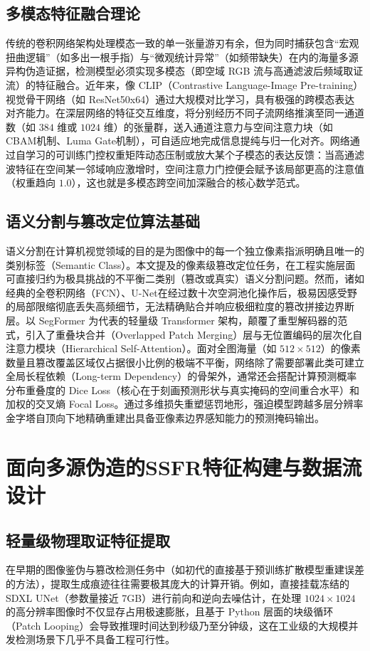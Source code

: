 \documentclass[UTF8, a4paper, 12pt]{ctexrep}
\begin{document}
\section{多模态特征融合理论}
传统的卷积网络架构处理模态一致的单一张量游刃有余，但为同时捕获包含“宏观扭曲逻辑”（如多出一根手指）与“微观统计异常”（如频带缺失）在内的海量多源异构伪造证据，检测模型必须实现多模态（即空域 RGB 流与高通滤波后频域取证流）的特征融合。近年来，像 CLIP（Contrastive Language-Image Pre-training）视觉骨干网络（如 ResNet50x64）通过大规模对比学习，具有极强的跨模态表达对齐能力。在深层网络的特征交互维度，将分别经历不同子流网络推演至同一通道数（如 $384$ 维或 $1024$ 维）的张量群，送入通道注意力与空间注意力块（如 CBAM机制、Luma Gate机制），可自适应地完成信息提纯与归一化对齐。网络通过自学习的可训练门控权重矩阵动态压制或放大某个子模态的表达反馈：当高通滤波特征在空间某一邻域响应激增时，空间注意力门控便会赋予该局部更高的注意值（权重趋向 $1.0$），这也就是多模态跨空间加深融合的核心数学范式。

\section{语义分割与篡改定位算法基础}
语义分割在计算机视觉领域的目的是为图像中的每一个独立像素指派明确且唯一的类别标签（Semantic Class）。本文提及的像素级篡改定位任务，在工程实施层面可直接归约为极具挑战的不平衡二类别（篡改或真实）语义分割问题。然而，诸如经典的全卷积网络（FCN）、U-Net在经过数十次空洞池化操作后，极易因感受野的局部限缩彻底丢失高频细节，无法精确贴合并响应极细粒度的篡改拼接边界断层。以 SegFormer 为代表的轻量级 Transformer 架构，颠覆了重型解码器的范式，引入了重叠块合并（Overlapped Patch Merging）层与无位置编码的层次化自注意力模块（Hierarchical Self-Attention）。面对全图海量（如 $512 \times 512$）的像素数量且篡改覆盖区域仅占据很小比例的极端不平衡，网络除了需要部署此类可建立全局长程依赖（Long-term Dependency）的骨架外，通常还会搭配计算预测概率分布重叠度的 Dice Loss（核心在于刻画预测形状与真实掩码的空间重合水平）和加权的交叉熵 Focal Loss。通过多维损失重塑惩罚地形，强迫模型跨越多层分辨率金字塔自顶向下地精确重建出具备亚像素边界感知能力的预测掩码输出。


\chapter{面向多源伪造的SSFR特征构建与数据流设计}

\section{轻量级物理取证特征提取}
在早期的图像鉴伪与篡改检测任务中（如初代的直接基于预训练扩散模型重建误差的方法），提取生成痕迹往往需要极其庞大的计算开销。例如，直接挂载冻结的 SDXL UNet（参数量接近 7GB）进行前向和逆向去噪估计，在处理 $1024 \times 1024$ 的高分辨率图像时不仅显存占用极速膨胀，且基于 Python 层面的块级循环（Patch Looping）会导致推理时间达到秒级乃至分钟级，这在工业级的大规模并发检测场景下几乎不具备工程可行性。
\end{document}
